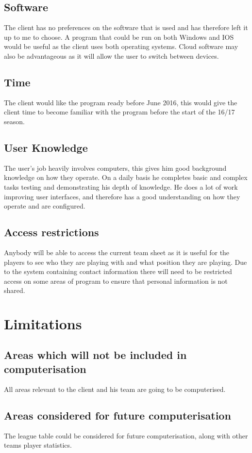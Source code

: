 \subsection{Software}
The client has no preferences on the software that is used and has therefore left it up to me to choose. A program that could be run on both Windows and IOS would be useful as the client uses both operating systems. Cloud software may also be advantageous as it will allow the user to switch between devices.   
\subsection{Time}
The client would like the program ready before June 2016, this would give the client time to become familiar with the program before the start of the 16/17 season. 
\subsection{User Knowledge}
The user's job heavily involves computers, this gives him good background knowledge on how they operate. On a daily basis he completes basic and complex tasks testing and  demonstrating his depth of knowledge. He does a lot of work improving user interfaces, and therefore has a good understanding on how they operate and are configured. 
\subsection{Access restrictions}
Anybody will be able to access the current team sheet as it is useful for the players to see who they are playing with and what position they are playing. Due to the system containing contact information there will need to be restricted access on some areas of program to ensure that personal information is not shared.   

\section{Limitations}

\subsection{Areas which will not be included in computerisation}
All areas relevant to the client and his team are going to be computerised.
\subsection{Areas considered for future computerisation}
The league table could be considered for future computerisation, along with other teams player statistics.
